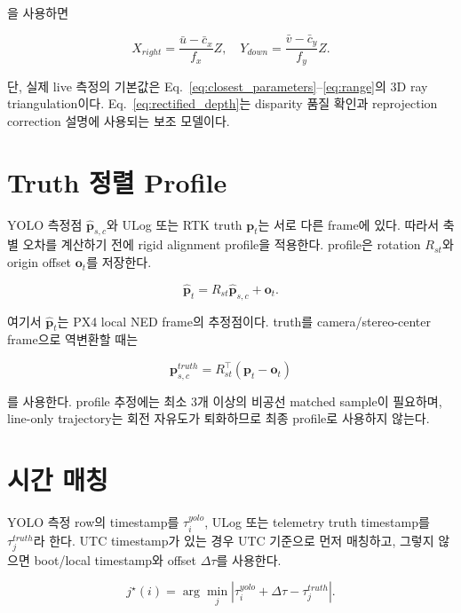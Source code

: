 \documentclass[10pt,conference]{IEEEtran}
\newcommand{\vect}[1]{\bm{#1}}
\begin{document}
을 사용하면

\begin{equation}
X_{right} = \frac{\bar{u}-\bar{c}_x}{f_x}Z,
\quad
Y_{down} = \frac{\bar{v}-\bar{c}_y}{f_y}Z.
\label{eq:rectified_lateral}
\end{equation}

단, 실제 live 측정의 기본값은 Eq.~\eqref{eq:closest_parameters}--\eqref{eq:range}의 3D ray triangulation이다.
Eq.~\eqref{eq:rectified_depth}는 disparity 품질 확인과 reprojection correction 설명에 사용되는 보조 모델이다.

\section{Truth 정렬 Profile}

YOLO 측정점 $\hat{\vect{p}}_{s,c}$와 ULog 또는 RTK truth $\vect{p}_t$는 서로 다른 frame에 있다.
따라서 축별 오차를 계산하기 전에 rigid alignment profile을 적용한다.
profile은 rotation $R_{st}$와 origin offset $\vect{o}_{t}$를 저장한다.

\begin{equation}
\hat{\vect{p}}_{t}
=
R_{st}\hat{\vect{p}}_{s,c}
+
\vect{o}_t.
\label{eq:alignment_apply}
\end{equation}

여기서 $\hat{\vect{p}}_{t}$는 PX4 local NED frame의 추정점이다.
truth를 camera/stereo-center frame으로 역변환할 때는

\begin{equation}
\vect{p}_{s,c}^{truth}
=
R_{st}^{\top}
\left(\vect{p}_{t}-\vect{o}_t\right)
\label{eq:alignment_inverse}
\end{equation}

를 사용한다.
profile 추정에는 최소 3개 이상의 비공선 matched sample이 필요하며, line-only trajectory는 회전 자유도가 퇴화하므로 최종 profile로 사용하지 않는다.

\section{시간 매칭}

YOLO 측정 row의 timestamp를 $\tau_i^{yolo}$, ULog 또는 telemetry truth timestamp를 $\tau_j^{truth}$라 한다.
UTC timestamp가 있는 경우 UTC 기준으로 먼저 매칭하고, 그렇지 않으면 boot/local timestamp와 offset $\Delta\tau$를 사용한다.

\begin{equation}
j^\star(i)
=
\arg\min_j
\left|
\tau_i^{yolo}
+\Delta\tau
-\tau_j^{truth}
\right|.
\label{eq:time_match}
\end{equation}
\end{document}
